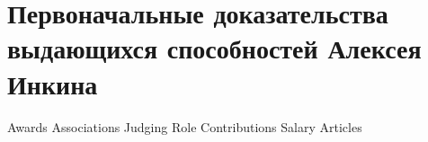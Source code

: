 \section{Первоначальные доказательства выдающихся способностей Алексея Инкина}

{Awards}
{Associations}
{Judging}
{Role}
{Contributions}
{Salary}
{Articles}
